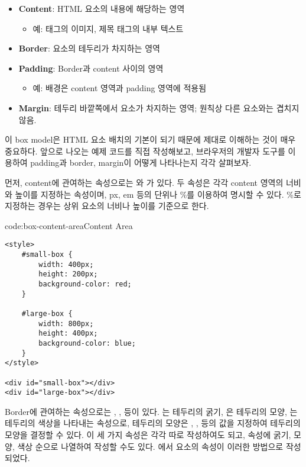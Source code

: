 \begin{itemize}
    \item \textbf{Content}: HTML 요소의 내용에 해당하는 영역
    \begin{itemize}
        \item 예:  태그의 이미지, 제목 태그의 내부 텍스트
    \end{itemize}
    \item \textbf{Border}: 요소의 테두리가 차지하는 영역
    \item \textbf{Padding}: Border과 content 사이의 영역
    \begin{itemize}
        \item 예: 배경은 content 영역과 padding 영역에 적용됨
    \end{itemize}
    \item \textbf{Margin}: 테두리 바깥쪽에서 요소가 차지하는 영역; 원칙상 다른 요소와는 겹치지 않음.
\end{itemize}

    {}

이 box model은 HTML 요소 배치의 기본이 되기 때문에 제대로 이해하는 것이 매우 중요하다. 앞으로 나오는 예제 코드를 직접 작성해보고, 브라우저의 개발자 도구를 이용하여 padding과 border, margin이 어떻게 나타나는지 각각 살펴보자.

먼저, content에 관여하는 속성으로는 와 가 있다. 두 속성은 각각 content 영역의 너비와 높이를 지정하는 속성이며, px, em 등의 단위나 \%를 이용하여 명시할 수 있다. \%로 지정하는 경우는 상위 요소의 너비나 높이를 기준으로 한다.

\begin{codeenv}{code:box-content-area}{Content Area}\begin{verbatim}
<style>
    #small-box {
        width: 400px;
        height: 200px;
        background-color: red;
    }

    #large-box {
        width: 800px;
        height: 400px;
        background-color: blue;
    }
</style>

<div id="small-box"></div>
<div id="large-box"></div>
\end{verbatim}
\end{codeenv}

Border에 관여하는 속성으로는 , ,  등이 있다. 는 테두리의 굵기, 은 테두리의 모양, 는 테두리의 색상을 나타내는 속성으로, 테두리의 모양은 , ,  등의 값을 지정하여 테두리의 모양을 결정할 수 있다. 이 세 가지 속성은 각각 따로 작성하여도 되고,  속성에 굵기, 모양, 색상 순으로 나열하여 작성할 수도 있다. 에서  요소의  속성이 이러한 방법으로 작성되었다.

